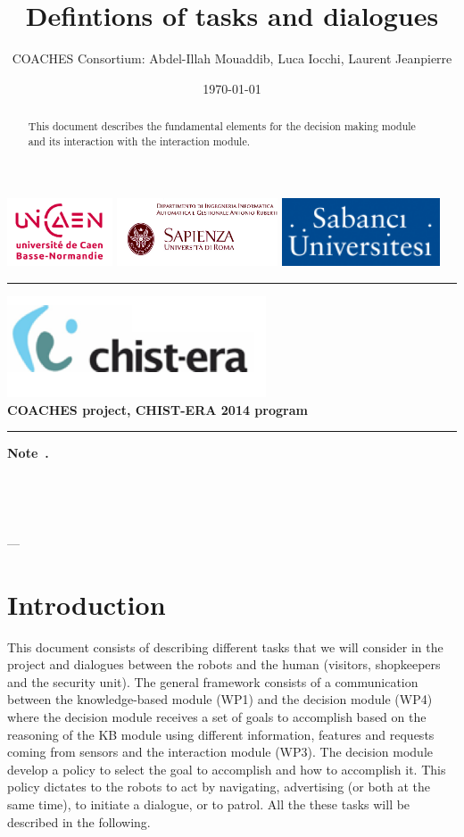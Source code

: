 \documentclass{article}
\title{ Defintions of tasks and dialogues}
\author{COACHES Consortium: Abdel-Illah Mouaddib, Luca Iocchi, Laurent Jeanpierre}
\date{\today}
\newcommand{\makemadtitle}{
  \hrule
  \vspace{.5em}
  \noindent
  \begin{center}
  \textbf{
  {\centering\includegraphics[height=3cm]{../fig/logoCHISTERA2014}}\\
   {\centering\Large COACHES project, CHIST-ERA 2014 program}
  }
  \end{center}
  \vspace{.5em}
 
  \hrule
  \vspace{3em}
  \begin{center}
    \begin{large}\textbf{ Note~\usebox{\notenumber}.}\end{large}\\[.5em]
    \begin{Large}\textbf{\usebox{\notetitle}}\end{Large}\\[2em]
    \begin{large}\usebox{\noteauthor} --- \usebox{\notedate}\end{large}
  \end{center}
  \vspace{3em}
}
\begin{document}
\includegraphics[height=2cm]{../fig/logoUNICAEN.jpg}
\includegraphics[height=2cm]{../fig/logoSapienza.png}
\includegraphics[height=2cm]{../fig/logoSebanci}


\makemadtitle

\vspace*{1.0in}
\begin{abstract}
 This document describes the fundamental elements for the decision making module and its interaction with the interaction module. 
  \end{abstract}

\vspace*{1.5in}

\newpage
\section{Introduction}
This document consists of describing different tasks that we will consider in the project and dialogues between the robots and the human (visitors, shopkeepers and the security unit).  The general framework consists of a communication between the knowledge-based module (WP1) and the decision module (WP4) where the decision module receives a set of goals to accomplish based on the reasoning of the KB module using different information, features and requests coming from sensors and the interaction module (WP3). The decision module develop a policy to select the goal to accomplish and how to accomplish it. This policy dictates to the robots to act by navigating, advertising (or both at the same time), to initiate a dialogue, or to patrol. All the these tasks will be described in the following. 
\end{document}
